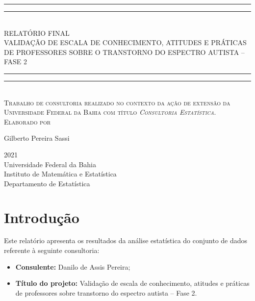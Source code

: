 \documentclass[
]{article}
\author{}
\date{\vspace{-2.5em}}
\providecommand{\tightlist}{%
  \setlength{\itemsep}{0pt}\setlength{\parskip}{0pt}}
\newlength{\drop}
\begin{document}
\onehalfspacing

\begin{titlepage}
    \textheight
    \centering
    \vspace*{\baselineskip}
    \rule{\textwidth}{1.6pt}\vspace*{-\baselineskip}\vspace*{2pt}
    \rule{\textwidth}{0.4pt}\\[\baselineskip]
    {\LARGE RELATÓRIO FINAL \\ 
    \vspace*{\baselineskip}
    VALIDAÇÃO DE ESCALA DE CONHECIMENTO, ATITUDES E PRÁTICAS DE PROFESSORES SOBRE O TRANSTORNO DO ESPECTRO AUTISTA -- FASE 2}\\[0.2\baselineskip]
    \rule{\textwidth}{0.4pt}\vspace*{-\baselineskip}\vspace{3.2pt}
    \rule{\textwidth}{1.6pt}\\[\baselineskip]
    \scshape
    Trabalho de consultoria realizado no contexto da ação de extensão da Universidade Federal da Bahia com título \textit{Consultoria Estatística}. \\
    \vspace*{2\baselineskip}
    Elaborado por \\[\baselineskip]
    {\Large Gilberto Pereira Sassi\par}
    \vfill
    {\scshape 2021} \\
    {\large Universidade Federal da Bahia}\\
    {\large Instituto de Matemática e Estatística}\\
    {\large Departamento de Estatística}\par
  \end{titlepage}

\newpage

\tableofcontents

\newpage

\hypertarget{introduuxe7uxe3o}{%
\section{Introdução}\label{introduuxe7uxe3o}}

Este relatório apresenta os resultados da análise estatística do conjunto de dados referente à seguinte consultoria:

\begin{itemize}
\tightlist
\item
  \textbf{Consulente:} Danilo de Assis Pereira;
\item
  \textbf{Título do projeto:} Validação de escala de conhecimento, atitudes e práticas de professores sobre transtorno do espectro autista -- Fase 2.
\end{itemize}
\end{document}
